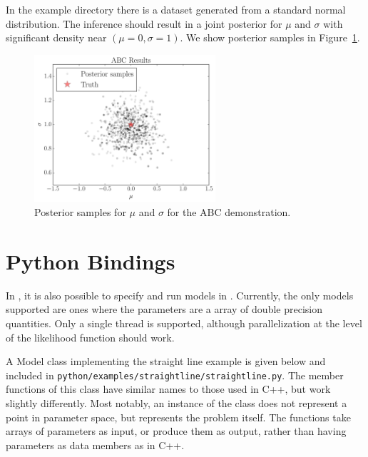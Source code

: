 \documentclass[article, nojss]{jss}
\begin{document}
In the example directory there is a dataset generated from
a standard normal distribution. The inference should
result in a joint posterior for $\mu$ and $\sigma$ with
significant density near $(\mu=0, \sigma=1)$.
We show posterior samples in Figure~\ref{fig:abc_results}.
\begin{figure}[ht!]
\centering
\includegraphics[width=0.6\textwidth]{figures/abc_results.pdf}
\caption{Posterior samples for $\mu$ and $\sigma$ for the
ABC demonstration.\label{fig:abc_results}}
\end{figure}

\section{Python Bindings}\label{sec:python_bindings}
In , it is also possible to specify and run models in
. Currently, the only models supported
are ones where the parameters
are a  array of double precision quantities.
Only a single thread is supported, although parallelization at
the level of the  likelihood function should work.

A Model class implementing the straight line example is given below
and included in {\tt python/examples/straightline/straightline.py}.
The member functions of this class have similar names to those
used in C++, but work slightly differently. Most notably,
an instance of the class does not represent a point in parameter
space, but represents the problem itself. The functions take
 arrays of parameters as input, or produce them as
output, rather than having parameters as data members as in C++.
\end{document}
